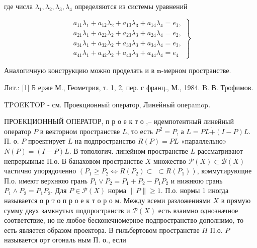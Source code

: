 \documentclass[10pt]{article}
\begin{document}
где числа $\lambda_{1}, \lambda_{2}, \lambda_{3}, \lambda_{4}$ определяются из системы уравнений



\[

\left.\begin{array}{l}

a_{11} \lambda_{1}+a_{12} \lambda_{2}+a_{13} \lambda_{3}+a_{14} \lambda_{4}=e_{1}, \\

a_{21} \lambda_{1}+a_{22} \lambda_{2}+a_{23} \lambda_{3}+a_{24} \lambda_{4}=e_{2}, \\

a_{31} \lambda_{1}+a_{32} \lambda_{2}+a_{33} \lambda_{3}+a_{34} \lambda_{4}=e_{3}, \\

a_{41} \lambda_{1}+a_{42} \lambda_{2}+a_{43} \lambda_{3}+a_{44} \lambda_{4}=e_{4}

\end{array}\right\}

\]



Аналогичную конструкцию можно проделать и в $\boldsymbol{n}$-мерном пространстве.



Лит.: [1] Б ерже М., Геометрия, т. 1, 2, пер. с франц., М., 1984. B. В. Трофимов.



TPOEKTOP - см. Проекционный оператор, Линейный опеpamop.



ПРОЕКЦИОННЫЙ ОПЕРАТОР, п р о е к т о ,-- идемпотентный линейный оператор $P$ в векторном пространстве $L$, то есть $P^{2}=P$, а $L=P L \dot{+}(I-P) L$. П. о. $P$ проектирует $L$ на подпространство $R(P)=P L$ «параллельно» $N(P)=(I-P) L$. В топологич. линейном пространстве $L$ рассматривают непрерывные П.о. В банаховом пространстве $X$ множество $\mathscr{P}(X) \subset \mathscr{B}(X)$ частично упорядоченно $\left(P_{1} \geqslant P_{2} \Leftrightarrow R\left(P_{2}\right) \subset\right.$ $\left.\subset R\left(P_{1}\right)\right)$, коммутирующие П.о. имеют верхнюю грань $P_{1} \vee P_{2}=P_{1}+P_{2}-P_{1} P_{2}$ и нижнюю грань $P_{1} \wedge P_{2}=P_{1} P_{2}$. Для $P \in \mathscr{P}(X)$ норма $\|P\| \geqslant 1$. П.о. нормы 1 иногда называется о р т о п р о е к т о р о м. Между всеми разложениями $X$ в прямую сумму двух замкнутых подпространств и $\mathscr{P}(X)$ есть взаимно однозначное соответствие, но не любое бесконечномерное подпространство дополнимо, то есть является образом проектора. В гильбертовом пространстве $H$ П.о. $P$ называется орт огональ ным П. о., если
\end{document}
